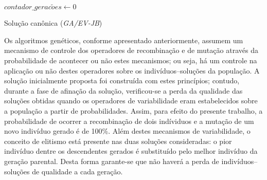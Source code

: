 \documentclass[relatorio,nocolorlinks]{inf-ufg}
\begin{document}
\medskip
\begin{center}
\begin{minipage}{0.92\textwidth}
\begin{algorithm2e}[H]
  \dontprintsemicolon
  \linesnumbered
  \SetLine
  \BlankLine
  \BlankLine
  $contador\_gerac\tilde{o}es \leftarrow 0$\;
\caption{Solu\c{c}\~{a}o can\^{o}nica (\textit{GA/EV-JB})}
\label{algoritmo1}
\end{algorithm2e}
\end{minipage}
\end{center}

Os algoritmos gen\'{e}ticos, conforme apresentado anteriormente, assumem um mecanismo de controle dos operadores de recombina\c{c}\~{a}o e de
muta\c{c}\~{a}o atrav\'{e}s da probabilidade de acontecer ou n\~{a}o estes mecanismos; ou seja, h\'{a} um controle na aplica\c{c}\~{a}o ou n\~{a}o
destes operadores sobre os indiv\'{i}duos--solu\c{c}\~{o}es da popula\c{c}\~{a}o. A solu\c{c}\~{a}o inicialmente proposta foi constru\'{i}da com
estes princ\'{i}pios; contudo, durante a fase de afina\c{c}\~{a}o da solu\c{c}\~{a}o, verificou-se a perda da qualidade das solu\c{c}\~{o}es
obtidas quando os operadores de variabilidade eram estabelecidos sobre a popula\c{c}\~{a}o a partir de probabilidades. Assim, para efeito do
presente trabalho, a probabilidade de ocorrer a recombina\c{c}\~{a}o de dois ind\'{i}viduos e a muta\c{c}\~{a}o de um novo indiv\'{i}duo gerado
\'{e} de 100\%. Al\'{e}m destes mecanismos de variabilidade, o conceito de elitismo est\'{a} presente nas duas solu\c{c}\~{o}es consideradas:
o pior indiv\'{i}duo dentre os descendentes gerados \'{e} substitu\'{i}do pelo melhor indiv\'{i}duo da gera\c{c}\~{a}o parental. Desta forma 
garante-se que n\~{a}o haver\'{a} a perda de indiv\'{i}duos--solu\c{c}\~{o}es de qualidade a cada gera\c{c}\~{a}o.
\end{document}
